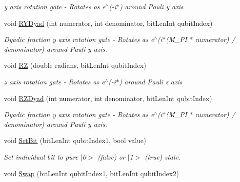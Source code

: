 \begin{DoxyCompactItemize}
\begin{DoxyCompactList}\small\item\em y axis rotation gate -\/ Rotates as e$^\wedge$(-\/i$\ast$) around Pauli y axis \end{DoxyCompactList}\item 
void \hyperlink{classQrack_1_1Register_af2ad9feb2e43e7301420be716900b4fd}{R\+Y\+Dyad} (int numerator, int denominator, bit\+Len\+Int qubit\+Index)
\begin{DoxyCompactList}\small\item\em Dyadic fraction y axis rotation gate -\/ Rotates as e$^\wedge$(i$\ast$(M\+\_\+\+PI $\ast$ numerator) / denominator) around Pauli y axis. \end{DoxyCompactList}\item 
void \hyperlink{classQrack_1_1Register_a5ab4ee73281c74cf84fa8eba599b211d}{RZ} (double radians, bit\+Len\+Int qubit\+Index)\hypertarget{classQrack_1_1Register_a5ab4ee73281c74cf84fa8eba599b211d}{}\label{classQrack_1_1Register_a5ab4ee73281c74cf84fa8eba599b211d}

\begin{DoxyCompactList}\small\item\em z axis rotation gate -\/ Rotates as e$^\wedge$(-\/i$\ast$) around Pauli z axis \end{DoxyCompactList}\item 
void \hyperlink{classQrack_1_1Register_af33f56698c61100082fca6ebdc0137b5}{R\+Z\+Dyad} (int numerator, int denominator, bit\+Len\+Int qubit\+Index)
\begin{DoxyCompactList}\small\item\em Dyadic fraction y axis rotation gate -\/ Rotates as e$^\wedge$(i$\ast$(M\+\_\+\+PI $\ast$ numerator) / denominator) around Pauli y axis. \end{DoxyCompactList}\item 
void \hyperlink{classQrack_1_1Register_a12f2734a1ab842b87e2766244f8f83b4}{Set\+Bit} (bit\+Len\+Int qubit\+Index1, bool value)\hypertarget{classQrack_1_1Register_a12f2734a1ab842b87e2766244f8f83b4}{}\label{classQrack_1_1Register_a12f2734a1ab842b87e2766244f8f83b4}

\begin{DoxyCompactList}\small\item\em Set individual bit to pure $\vert$0$>$ (false) or $\vert$1$>$ (true) state. \end{DoxyCompactList}\item 
void \hyperlink{classQrack_1_1Register_a60bb6e4eb965ffdb264a22ef19524756}{Swap} (bit\+Len\+Int qubit\+Index1, bit\+Len\+Int qubit\+Index2)\hypertarget{classQrack_1_1Register_a60bb6e4eb965ffdb264a22ef19524756}{}\label{classQrack_1_1Register_a60bb6e4eb965ffdb264a22ef19524756}


\end{DoxyCompactItemize}

